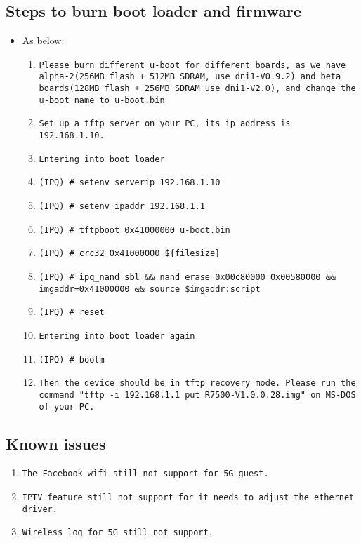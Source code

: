 \documentclass[12pt]{report}
\begin{document}
    \subsection{Steps to burn boot loader and firmware}
    \begin{itemize}
    \item As below:
            \begin{enumerate}
	    	\item \texttt{Please burn different u-boot for different boards, as we have alpha-2(256MB flash + 512MB SDRAM, use dni1-V0.9.2) and beta boards(128MB flash + 256MB SDRAM use dni1-V2.0), and change the u-boot name to u-boot.bin}
		\item \texttt{Set up a tftp server on your PC, its ip address is 192.168.1.10.}
		\item \texttt{Entering into boot loader}
		\item \texttt{(IPQ) \# setenv serverip 192.168.1.10}
		\item \texttt{(IPQ) \# setenv ipaddr 192.168.1.1}
		\item \texttt{(IPQ) \# tftpboot 0x41000000 u-boot.bin}
		\item \texttt{(IPQ) \# crc32 0x41000000 \$\{filesize\}}
		\item \texttt{(IPQ) \# ipq\_nand sbl \&\& nand erase 0x00c80000 0x00580000 \&\& imgaddr=0x41000000 \&\& source \$imgaddr:script}
		\item \texttt{(IPQ) \# reset}
		\item \texttt{Entering into boot loader again}
		\item \texttt{(IPQ) \# bootm}
		\item \texttt{Then the device should be in tftp recovery mode. Please run the command "tftp -i 192.168.1.1 put R7500-V1.0.0.28.img" on MS-DOS of your PC.}
            \end{enumerate}
    \end{itemize}

\subsection{Known issues}
            \begin{enumerate}
		\item \texttt{The Facebook wifi still not support for 5G guest.}
		\item \texttt{IPTV feature still not support for it needs to adjust the ethernet driver.}
		\item \texttt{Wireless log for 5G still not support.}
            \end{enumerate}
\end{document}
